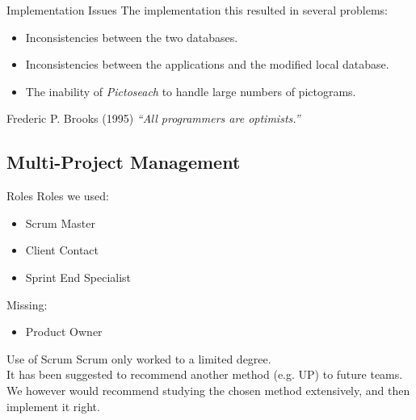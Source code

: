 \begin{frame}{Implementation Issues}
	The implementation this resulted in several problems:
	\begin{itemize}
		\item<1> Inconsistencies between the two databases.
		\item<2> Inconsistencies between the applications and the modified local database.
		\item<3> The inability of \textit{Pictoseach} to handle large numbers of pictograms.
	\end{itemize}
\pause
	\begin{block}{Frederic P. Brooks (1995)}
    	\textit{``All programmers are optimists.''}
   	\end{block}
\end{frame}


\subsection{Multi-Project Management}

\begin{frame}{Roles}
	Roles we used:
	\begin{itemize}
		\item Scrum Master
		\item Client Contact
		\item Sprint End Specialist
	\end{itemize}
	\pause
	Missing:
	\begin{itemize}
		\item Product Owner
	\end{itemize}
\end{frame}

\begin{frame}{Use of Scrum}
	Scrum only worked to a limited degree.\\
	\vspace{\baselineskip}
	It has been suggested to recommend another method (e.g. UP) to future teams.\\
	\vspace{\baselineskip}
	We however would recommend studying the chosen method extensively, and then implement it right.
\end{frame}
